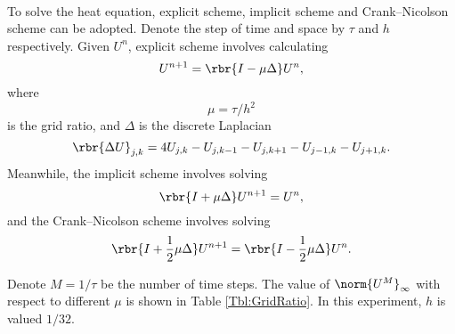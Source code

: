 \documentclass[english, nochinese]{pkupaper}
\title{\titlemark}
\author{\authoring}
\date{July 14, 2018}
\begin{document}
\maketitle

\begin{thmquestion}
\ 
\begin{thmanswer}
To solve the heat equation, explicit scheme, implicit scheme and Crank--Nicolson scheme can be adopted. Denote the step of time and space by $\tau$ and $h$ respectively. Given $U^n$, explicit scheme involves calculating
\begin{equation}
U^{ n + 1 } = \rbr{ I - \mu \Delta } U^n,
\end{equation}
where
\begin{equation}
\mu = \tau / h^2
\end{equation}
is the grid ratio, and $\Delta$ is the discrete Laplacian
\begin{equation}
\rbr{ \Delta U }_{ j, k } = 4 U_{ j, k } - U_{ j, k - 1 } - U_{ j, k + 1 } - U_{ j - 1, k } - U_{ j + 1, k }.
\end{equation}
Meanwhile, the implicit scheme involves solving
\begin{equation}
\rbr{ I + \mu \Delta } U^{ n + 1 } = U^n,
\end{equation}
and the Crank--Nicolson scheme involves solving
\begin{equation}
\rbr{ I + \frac{1}{2} \mu \Delta } U^{ n + 1 } = \rbr{ I - \frac{1}{2} \mu \Delta } U^n.
\end{equation}

Denote $ M = 1 / \tau $ be the number of time steps. The value of $\norm{U^{M}}_{\infty}$ with respect to different $\mu$ is shown in Table \ref{Tbl:GridRatio}. In this experiment, $h$ is valued $ 1 / 32 $.


\end{thmanswer}
\end{thmquestion}
\end{document}
